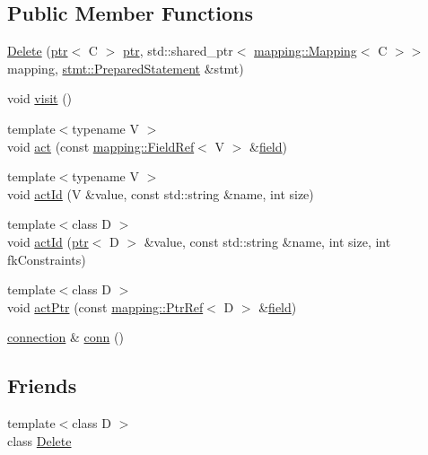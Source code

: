 \subsection*{Public Member Functions}
\begin{DoxyCompactItemize}
\item 
\hyperlink{classdbo_1_1action_1_1_delete_a54b012c688f8a3bcb5e1a7b83b1b0cbb}{Delete} (\hyperlink{classdbo_1_1ptr}{ptr}$<$ C $>$ \hyperlink{classdbo_1_1ptr}{ptr}, std\+::shared\+\_\+ptr$<$ \hyperlink{classdbo_1_1mapping_1_1_mapping}{mapping\+::\+Mapping}$<$ C $>$$>$ mapping, \hyperlink{classdbo_1_1stmt_1_1_prepared_statement}{stmt\+::\+Prepared\+Statement} \&stmt)
\item 
void \hyperlink{classdbo_1_1action_1_1_delete_ad62b6538bec4bf5ca147cb1e167185c5}{visit} ()
\item 
{\footnotesize template$<$typename V $>$ }\\void \hyperlink{classdbo_1_1action_1_1_delete_ad9e186a046fa212f320bb356755d7e9c}{act} (const \hyperlink{classdbo_1_1mapping_1_1_field_ref}{mapping\+::\+Field\+Ref}$<$ V $>$ \&\hyperlink{namespacedbo_ad1f50f02cb050acf946807959252a93f}{field})
\item 
{\footnotesize template$<$typename V $>$ }\\void \hyperlink{classdbo_1_1action_1_1_delete_a8f4fc3e3b29cf499413084b9b022bc4d}{act\+Id} (V \&value, const std\+::string \&name, int size)
\item 
{\footnotesize template$<$class D $>$ }\\void \hyperlink{classdbo_1_1action_1_1_delete_ae28a7db6bd7b2a92fe65b6e3cdb20d11}{act\+Id} (\hyperlink{classdbo_1_1ptr}{ptr}$<$ D $>$ \&value, const std\+::string \&name, int size, int fk\+Constraints)
\item 
{\footnotesize template$<$class D $>$ }\\void \hyperlink{classdbo_1_1action_1_1_delete_ac8d1309f52fb2b7242f4389aabf5d760}{act\+Ptr} (const \hyperlink{classdbo_1_1mapping_1_1_ptr_ref}{mapping\+::\+Ptr\+Ref}$<$ D $>$ \&\hyperlink{namespacedbo_ad1f50f02cb050acf946807959252a93f}{field})
\item 
\hyperlink{classdbo_1_1connection}{connection} \& \hyperlink{classdbo_1_1action_1_1_delete_a224df8996204c37b65f50fa94678ec7a}{conn} ()
\end{DoxyCompactItemize}
\subsection*{Friends}
\begin{DoxyCompactItemize}
\item 
{\footnotesize template$<$class D $>$ }\\class \hyperlink{classdbo_1_1action_1_1_delete_a86bcfdc8a57bb29053c4150ab69352a8}{Delete}
\end{DoxyCompactItemize}


